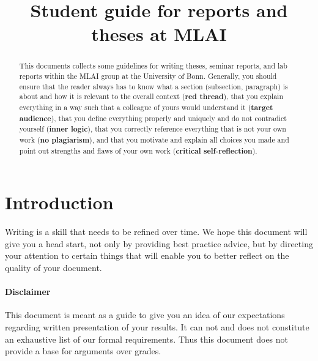 \documentclass[nodate]{proc}
\date{} %
\begin{document}
\title{\textbf{Student guide for reports and theses at MLAI}}
% 		

\maketitle

\begin{abstract}
	This documents collects some guidelines for writing theses, seminar reports, and lab reports within the MLAI group at the University of Bonn.
	Generally, you should ensure that
	the reader always has to know what a section (subsection, paragraph) is about and how it is relevant to the overall context (\textbf{red thread}), that you explain everything in a way such that a colleague of yours would understand it (\textbf{target audience}), that you define everything properly and uniquely and do not contradict yourself (\textbf{inner logic}), that you correctly reference everything that is not your own work (\textbf{no plagiarism}), and that you motivate and explain all choices you made and point out strengths and flaws of your own work (\textbf{critical self-reflection}).

\end{abstract}

\tableofcontents


\section{Introduction}
Writing is a skill that needs to be refined over time. We hope this document will give you a head start, not only by providing best practice advice, but by directing your attention to certain things that will enable you to better reflect on the quality of your document.

\paragraph{Disclaimer} This document is meant as a guide to give you an idea of our expectations regarding written presentation of your results. It can not and does not constitute an exhaustive list of our formal requirements. Thus this document does not provide a base for arguments over grades.
\end{document}
